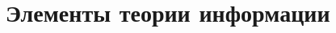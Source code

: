 


\section{Элементы теории информации}
\begin{comment}
\subsection{Основные определения}
Пусть $X$ - дискретная случайная величина, принимающая значения из конечного множества (алфавита) $A = \{a_1,..., a_{|A|}\}$. $P = \{\mathbb{P}\{X = a_i\} = p_{a_i}\}$ - вероятностное распределение $X$ на $A$.

\begin{definition} \textit{Словом} в алфавите $A$ будем называть реализацию последовательности случайных величин $X_1,...,X_n..$: $w = (x_1...x_n..)$, $x_i \in A$.
\end{definition}

\begin{definition} 
\textit{Энтропией} $H(X)$ случайной величины $X$ распределенной по закону $P$ называется:
\begin{center}
$H(X) = - \sum_{a \in A} p_a\log p_a$, где $\log = \log_2$.
\end{center}
Иногда вместо $H(X)$  используется запись $H(P)$.
Энтропия измеряется в битах и интерпретируется как мера неопределенности или информационного содержания случайной величины. Чем она больше, тем больше неопределенность. В качестве иллюстрации, читателю предлагается решить первую задачу.
\end{definition}
В случае нескольких случайных величин можно определить два тесно связанных понятия: \textit{условной энтропии} и \textit{совместной информации}.
\begin{definition}
\textit{Условной энтропией} двух с.в. $X$ и $Y$ называется $H(X|Y) = \sum_{a \in A} \mathbb{P}(Y = a)H(X|Y=a)$, где $H(X|Y=a) = \sum_{a' \in A} \frac{\mathbb{P}(X = a', Y = a)}{\mathbb{P}(Y = a)} \log \frac{\mathbb{P}(X = a', Y = a)}{\mathbb{P}(Y = a)}$. Условная энтропия характеризует ту среднюю степень неопределнности, содержащейся в $X$, если имеется некоторая информация об $Y$.
\end{definition}

\begin{definition}
\textit{Совместная информация} $I(X,Y) = H(X) - H(X|Y)$ определяет то, сколько информации об $X$ содержится в $Y$.
\end{definition}


\end{comment}
